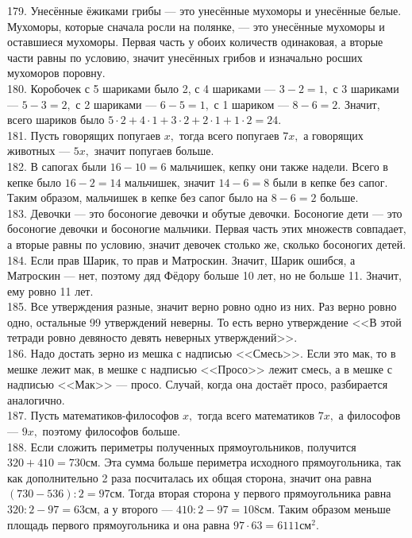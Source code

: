 \documentclass[12pt]{article}
\begin{document}
179. Унесённые ёжиками грибы --- это унесённые мухоморы и унесённые белые. Мухоморы, которые сначала росли на полянке, --- это унесённые мухоморы и оставшиеся мухоморы. Первая часть у обоих количеств одинаковая, а вторые части равны по условию, значит унесённых грибов и изначально росших мухоморов поровну.\\
180. Коробочек с 5 шариками было 2, с 4 шариками --- $3-2=1,$ с 3 шариками --- $5-3=2,$ с 2 шариками --- $6-5=1,$ с 1 шариком --- $8-6=2.$ Значит, всего шариков было $5\cdot2+4\cdot1+3\cdot2+2\cdot1+1\cdot2=24.$\\
181. Пусть говорящих попугаев $x,$ тогда всего попугаев $7x,$ а говорящих животных --- $5x,$ значит попугаев больше.\\
182. В сапогах были $16-10=6$ мальчишек, кепку они также надели. Всего в кепке было $16-2=14$ мальчишек, значит $14-6=8$ были в кепке без сапог. Таким образом, мальчишек в кепке без сапог было на $8-6=2$ больше.\\
183. Девочки --- это босоногие девочки и обутые девочки. Босоногие дети --- это босоногие девочки и босоногие мальчики. Первая часть этих множеств совпадает, а вторые равны по условию, значит девочек столько же, сколько босоногих детей.\\
184. Если прав Шарик, то прав и Матроскин. Значит, Шарик ошибся, а Матроскин --- нет, поэтому дяд Фёдору больше 10 лет, но не больше 11. Значит, ему ровно 11 лет.\\
185. Все утверждения разные, значит верно ровно одно из них. Раз верно ровно одно, остальные 99 утверждений неверны. То есть верно утверждение <<В этой тетради ровно девяносто девять неверных утверждений>>.\\
186. Надо достать зерно из мешка с надписью <<Смесь>>. Если это мак, то в мешке лежит мак, в мешке с надписью <<Просо>> лежит смесь, а в мешке с надписью <<Мак>> --- просо. Случай, когда она достаёт просо, разбирается аналогично.\\
187. Пусть математиков-философов $x,$ тогда всего математиков $7x,$ а философов --- $9x,$ поэтому философов больше.\\
188. Если сложить периметры полученных прямоугольников, получится $320+410=730$см. Эта сумма больше периметра исходного прямоугольника, так как дополнительно 2 раза посчиталась их общая сторона, значит она равна $(730-536):2=97$см. Тогда вторая сторона у первого прямоугольника равна $320:2-97=63$см, а у второго --- $410:2-97=108$см. Таким образом меньше площадь первого прямоугольника и она равна $97\cdot63=6111\text{см}^2.$\\
\end{document}
